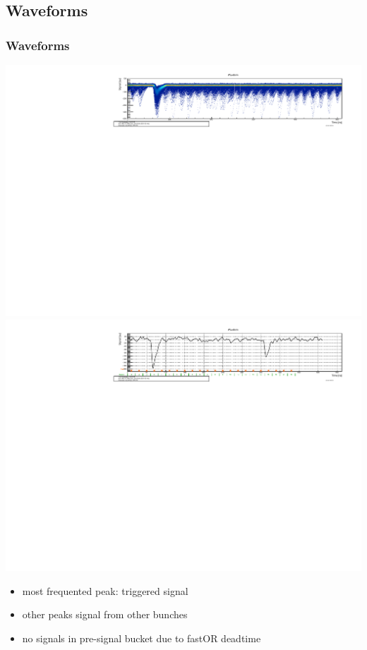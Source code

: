 \documentclass[9pt]{beamer}
\begin{document}
\subsection{Waveforms}
\begin{frame}
	\frametitle{Waveforms}
	\begin{center}
		\includegraphics[angle=270, width=.8\textwidth]{WFStack}\\
		\includegraphics[angle=270, width=.8\textwidth]{Waveform}\\
	\end{center}
	\begin{itemize}
		\item most frequented peak: triggered signal
		\item other peaks signal from other bunches
		\item no signals in pre-signal bucket due to fastOR deadtime
	\end{itemize}
\end{frame}
\end{document}
